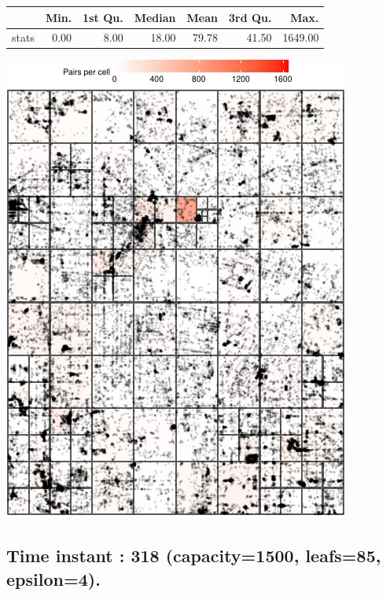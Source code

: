 \documentclass[
  9pt,
  landscape]{article}
\begin{document}
\begin{minipage}{0.5\textwidth} 
\centering 
\begin{tabular}{rrrrrrr}
  \hline
 & Min. & 1st Qu. & Median & Mean & 3rd Qu. & Max. \\ 
  \hline
stats & 0.00 & 8.00 & 18.00 & 79.78 & 41.50 & 1649.00 \\ 
   \hline
\end{tabular}
\vspace{0.5cm} 


\includegraphics[width=1\linewidth,height=0.8\textheight]{distance_files/figure-latex/p2_318_1000_4-1} 

\end{minipage}

\pagebreak

\hypertarget{time-instant-318-capacity1500-leafs85-epsilon4.}{%
\subsection{Time instant : 318 (capacity=1500, leafs=85,
epsilon=4).}\label{time-instant-318-capacity1500-leafs85-epsilon4.}}
\end{document}
